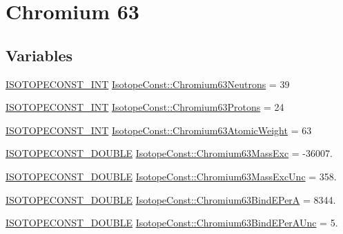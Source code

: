 \hypertarget{group___isotope_const-_chromium-_cr63}{}\section{Chromium 63}
\label{group___isotope_const-_chromium-_cr63}
\subsection*{Variables}
\begin{DoxyCompactItemize}
\item 
\mbox{\hyperlink{group___isotope_const-_macros_ga5f18360b3e99483a35c32d789e62621c}{I\+S\+O\+T\+O\+P\+E\+C\+O\+N\+S\+T\+\_\+\+I\+NT}} \mbox{\hyperlink{group___isotope_const-_chromium-_cr63_ga3b75503127a905a13e79d3e9856dd439}{Isotope\+Const\+::\+Chromium63\+Neutrons}} = 39
\item 
\mbox{\hyperlink{group___isotope_const-_macros_ga5f18360b3e99483a35c32d789e62621c}{I\+S\+O\+T\+O\+P\+E\+C\+O\+N\+S\+T\+\_\+\+I\+NT}} \mbox{\hyperlink{group___isotope_const-_chromium-_cr63_ga82f38e25b2a972955fb08df943a3ef7b}{Isotope\+Const\+::\+Chromium63\+Protons}} = 24
\item 
\mbox{\hyperlink{group___isotope_const-_macros_ga5f18360b3e99483a35c32d789e62621c}{I\+S\+O\+T\+O\+P\+E\+C\+O\+N\+S\+T\+\_\+\+I\+NT}} \mbox{\hyperlink{group___isotope_const-_chromium-_cr63_gad5ad34737443098f363914194b0b6ca9}{Isotope\+Const\+::\+Chromium63\+Atomic\+Weight}} = 63
\item 
\mbox{\hyperlink{group___isotope_const-_macros_ga8f45a7272ce02c0b4c65c44636ed719a}{I\+S\+O\+T\+O\+P\+E\+C\+O\+N\+S\+T\+\_\+\+D\+O\+U\+B\+LE}} \mbox{\hyperlink{group___isotope_const-_chromium-_cr63_ga9fc9d907531606def92d2b1512520b0b}{Isotope\+Const\+::\+Chromium63\+Mass\+Exc}} = -\/36007.
\item 
\mbox{\hyperlink{group___isotope_const-_macros_ga8f45a7272ce02c0b4c65c44636ed719a}{I\+S\+O\+T\+O\+P\+E\+C\+O\+N\+S\+T\+\_\+\+D\+O\+U\+B\+LE}} \mbox{\hyperlink{group___isotope_const-_chromium-_cr63_gafd7c5731d6e9b90334cdc31b4fcd89ec}{Isotope\+Const\+::\+Chromium63\+Mass\+Exc\+Unc}} = 358.
\item 
\mbox{\hyperlink{group___isotope_const-_macros_ga8f45a7272ce02c0b4c65c44636ed719a}{I\+S\+O\+T\+O\+P\+E\+C\+O\+N\+S\+T\+\_\+\+D\+O\+U\+B\+LE}} \mbox{\hyperlink{group___isotope_const-_chromium-_cr63_gad152965e09e8be8d30fec2e418a4a9b1}{Isotope\+Const\+::\+Chromium63\+Bind\+E\+PerA}} = 8344.
\item 
\mbox{\hyperlink{group___isotope_const-_macros_ga8f45a7272ce02c0b4c65c44636ed719a}{I\+S\+O\+T\+O\+P\+E\+C\+O\+N\+S\+T\+\_\+\+D\+O\+U\+B\+LE}} \mbox{\hyperlink{group___isotope_const-_chromium-_cr63_ga818de753c963ca75899319e455c9e6da}{Isotope\+Const\+::\+Chromium63\+Bind\+E\+Per\+A\+Unc}} = 5.

\end{DoxyCompactItemize}
